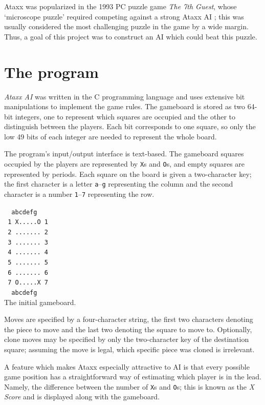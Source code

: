 \documentclass[12pt]{article}
\newcommand{\X}{\texttt{X}}
\renewcommand{\O}{\texttt{O}}
\begin{document}
Ataxx was popularized in the 1993 PC puzzle game \textsl{The 7th Guest}, whose `microscope puzzle' required competing against a strong Ataxx AI \cite{pressibus2}; this was usually considered the most challenging puzzle in the game by a wide margin.  Thus, a goal of this project was to construct an AI which could beat this puzzle.

\section{The program}
\textsl{Ataxx AI} was written in the C programming language and uses extensive bit manipulations to implement the game rules.  The gameboard is stored as two 64-bit integers, one to represent which squares are occupied and the other to distinguish between the players.  Each bit corresponds to one square, so only the low 49 bits of each integer are needed to represent the whole board.

The program's input/output interface is text-based.
The gameboard squares occupied by the players are represented by \X s and \O s, and empty squares are represented by periods.
Each square on the board is given a two-character key; the first character is a letter \texttt{a}--\texttt{g} representing the column and the second character is a number \texttt{1}--\texttt{7} representing the row.

\begin{center}
\texttt{~~abcdefg~~\\
~1~X.....O~1~\\
~2~.......~2~\\
~3~.......~3~\\
~4~.......~4~\\
~5~.......~5~\\
~6~.......~6~\\
~7~O.....X~7~\\
~~abcdefg~~}\\
The initial gameboard.
\end{center}

Moves are specified by a four-character string, the first two characters denoting the piece to move and the last two denoting the square to move to.  Optionally, clone moves may be specified by only the two-character key of the destination square; assuming the move is legal, which specific piece was cloned is irrelevant.

A feature which makes Ataxx especially attractive to AI is that every possible game position has a straightforward way of estimating which player is in the lead.  Namely, the difference between the number of \X s and \O s; this is known as the \emph{X Score} and is displayed along with the gameboard.
\end{document}
